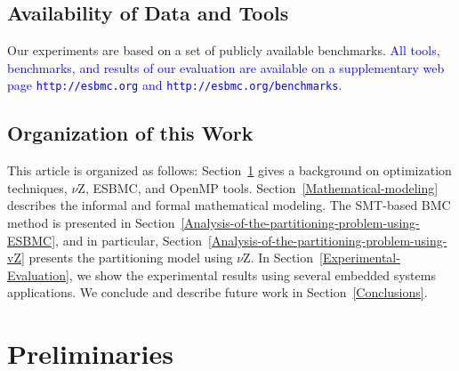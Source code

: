 \documentclass{doublecol-new}
\theoremstyle{TH}{
\newtheorem{lemma}{Lemma}
\newtheorem{theorem}[lemma]{Theorem}
\newtheorem{corrolary}[lemma]{Corrolary}
\newtheorem{conjecture}[lemma]{Conjecture}
\newtheorem{proposition}[lemma]{Proposition}
\newtheorem{claim}[lemma]{Claim}
\newtheorem{stheorem}[lemma]{Wrong Theorem}
\newtheorem{algorithm}{Algorithm}
}
\theoremstyle{THrm}{
\newtheorem{definition}{Definition}[section]
\newtheorem{question}{Question}[section]
\newtheorem{remark}{Remark}
\newtheorem{scheme}{Scheme}
}
\theoremstyle{THhit}{
\newtheorem{case}{Case}[section]
}
\begin{document}

\subsection{Availability of Data and Tools}

Our experiments are based on a set of publicly available benchmarks. \textcolor{blue}{All tools, benchmarks, and results of our evaluation are available on a supplementary web page \texttt{http://esbmc.org} and \texttt{http://esbmc.org/benchmarks}}.

\subsection{Organization of this Work}

This article is organized as follows: Section~\ref{background} gives a background on optimization techniques, $\nu$Z, ESBMC, and OpenMP tools. 
Section~\ref{Mathematical-modeling} describes the informal and formal mathematical modeling. The SMT-based BMC method is presented in Section~\ref{Analysis-of-the-partitioning-problem-using-ESBMC}, and in particular, Section~\ref{Analysis-of-the-partitioning-problem-using-vZ} presents the partitioning model using $\nu$Z. In Section~\ref{Experimental-Evaluation}, we show the experimental results using several embedded systems applications. We conclude and describe future work in Section~\ref{Conclusions}.

\section{Preliminaries}
\label{background}
\end{document}
